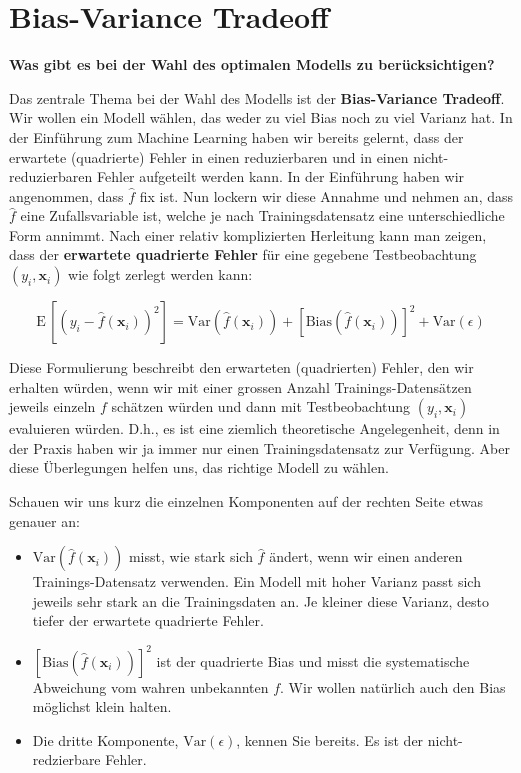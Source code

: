 \documentclass[
]{book}
\providecommand{\tightlist}{%
  \setlength{\itemsep}{0pt}\setlength{\parskip}{0pt}}
\begin{document}
\hypertarget{bias-variance-tradeoff}{%
\section{Bias-Variance Tradeoff}\label{bias-variance-tradeoff}}

\textbf{Was gibt es bei der Wahl des optimalen Modells zu berücksichtigen?}

Das zentrale Thema bei der Wahl des Modells ist der \textbf{Bias-Variance Tradeoff}. Wir wollen ein Modell wählen, das weder zu viel Bias noch zu viel Varianz hat. In der Einführung zum Machine Learning haben wir bereits gelernt, dass der erwartete (quadrierte) Fehler in einen reduzierbaren und in einen nicht-reduzierbaren Fehler aufgeteilt werden kann. In der Einführung haben wir angenommen, dass \(\hat{f}\) fix ist. Nun lockern wir diese Annahme und nehmen an, dass \(\hat{f}\) eine Zufallsvariable ist, welche je nach Trainingsdatensatz eine unterschiedliche Form annimmt. Nach einer relativ komplizierten Herleitung kann man zeigen, dass der \textbf{erwartete quadrierte Fehler} für eine gegebene Testbeobachtung \((y_i,\mathbf{x}_i)\) wie folgt zerlegt werden kann:

\[
\text{E}\,\left[\left(y_i - \hat{f}(\mathbf{x}_i)\right)^2\right] = \text{Var}\left(\hat{f}(\mathbf{x}_i)\right) + \left[\text{Bias}\left(\hat{f}(\mathbf{x}_i)\right)\right]^2 + \text{Var}(\epsilon)
\]

Diese Formulierung beschreibt den erwarteten (quadrierten) Fehler, den wir erhalten würden, wenn wir mit einer grossen Anzahl Trainings-Datensätzen jeweils einzeln \(f\) schätzen würden und dann mit Testbeobachtung \((y_i,\mathbf{x}_i)\) evaluieren würden. D.h., es ist eine ziemlich theoretische Angelegenheit, denn in der Praxis haben wir ja immer nur einen Trainingsdatensatz zur Verfügung. Aber diese Überlegungen helfen uns, das richtige Modell zu wählen.

Schauen wir uns kurz die einzelnen Komponenten auf der rechten Seite etwas genauer an:

\begin{itemize}
\tightlist
\item
  \(\text{Var}\left(\hat{f}(\mathbf{x}_i)\right)\) misst, wie stark sich \(\hat{f}\) ändert, wenn wir einen anderen Trainings-Datensatz verwenden. Ein Modell mit hoher Varianz passt sich jeweils sehr stark an die Trainingsdaten an. Je kleiner diese Varianz, desto tiefer der erwartete quadrierte Fehler.
\item
  \(\left[\text{Bias}\left(\hat{f}(\mathbf{x}_i)\right)\right]^2\) ist der quadrierte Bias und misst die systematische Abweichung vom wahren unbekannten \(f\). Wir wollen natürlich auch den Bias möglichst klein halten.
\item
  Die dritte Komponente, \(\text{Var}(\epsilon)\), kennen Sie bereits. Es ist der nicht-redzierbare Fehler.
\end{itemize}
\end{document}
